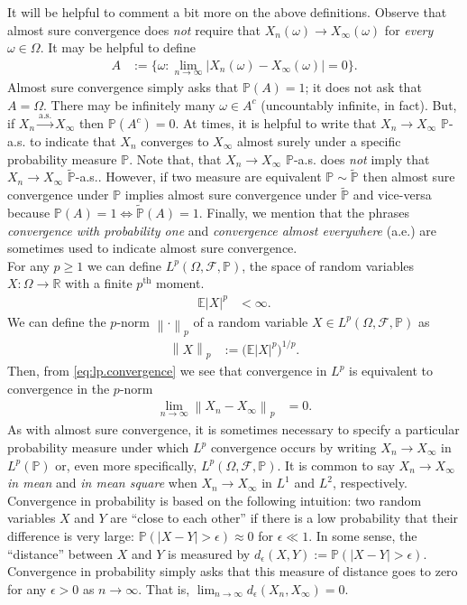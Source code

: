 \documentclass[12pt]{book}
\let\varepsilon\epsilon
\numberwithin{equation}{chapter}
\theoremstyle{plain}
\numberwithin{theorem}{section}
\theoremstyle{definition}
\numberwithin{exercise}{chapter}
\newcommand{\<}{\langle}
\renewcommand{\>}{\rangle}
\renewcommand{\(}{\left(}
\renewcommand{\)}{\right)}
\renewcommand{\[}{\left[}
\renewcommand{\]}{\right]}
\newcommand\Eb{\mathds{E}}
\newcommand\Pb{\mathds{P}}
\newcommand\Rb{\mathds{R}}
\newcommand\Fc{\mathscr{F}}
\newcommand\eps{\varepsilon}
\newcommand\om{\omega}
\newcommand\Om{\Omega}
\newcommand\Pbt{\widetilde{\Pb}}
\newcommand{\norm}[1]{\left\|#1\right\|}
\begin{document}
\noindent
It will be helpful to comment a bit more on the above definitions.
Observe that almost sure convergence does \emph{not} require that $X_n(\om) \to X_\infty(\om)$ for \emph{every} $\om \in \Om$.  It may be helpful to define
\begin{align}
A
	&:=	\{ \om : \lim_{n \to \infty} | X_n(\om) - X_\infty(\om) | = 0 \} .
\end{align}
Almost sure convergence simply asks that $\Pb( A ) = 1$; it does not ask that $A = \Om$.  There may be infinitely many $\om \in A^c$ (uncountably infinite, in fact).  But, if $X_n \stackrel{\text{a.s.}}{\to} X_\infty$ then $\Pb(A^c) = 0$.  At times, it is helpful to write that $X_n \to X_\infty$ $\Pb$-a.s. to indicate that $X_n$ converges to $X_\infty$ almost surely under a specific probability measure $\Pb$.  Note that, that $X_n \to X_\infty$ $\Pb$-a.s. does \emph{not} imply that $X_n \to X_\infty$ $\Pbt$-a.s..  However, if two measure are equivalent $\Pb \sim \Pbt$ then almost sure convergence under $\Pb$ implies almost sure convergence under $\Pbt$ and vice-versa because $\Pb(A) = 1 \Leftrightarrow \Pbt(A)=1$.  Finally, we mention that the phrases \emph{convergence with probability one} and \emph{convergence almost everywhere} (a.e.) are sometimes used to indicate almost sure convergence.
\\[0.5em]
For any $p \geq 1$ we can define $L^p(\Om,\Fc,\Pb)$, the space of random variables $X : \Om \to \Rb$ with a finite $p^\text{th}$ moment.
\begin{align}
\Eb |X|^p
	&< \infty .
\end{align}
We can define the $p$-norm $\norm{ \cdot }_p$ of a random variable $X \in L^p(\Om,\Fc,\Pb)$ as
\begin{align}
\norm{X}_p
	&:=	\big( \Eb |X|^p \big)^{1/p} .
\end{align}
Then, from \eqref{eq:lp.convergence} we see that convergence in $L^p$ is equivalent to convergence in the $p$-norm
\begin{align}
\lim_{n \to \infty} \norm{X_n - X_\infty}_p
	&=	0 .
\end{align}
As with almost sure convergence, it is sometimes necessary to specify a particular probability measure under which $L^p$ convergence occurs by writing $X_n \to X_\infty$ in $L^p(\Pb)$ or, even more specifically, $L^p(\Om,\Fc,\Pb)$.  It is common to say $X_n \to X_\infty$ \emph{in mean} and \emph{in mean square} when $X_n \to X_\infty$ in $L^1$ and $L^2$, respectively.
\\[0.5em]
Convergence in probability is based on the following intuition: two random variables $X$ and $Y$ are ``close to each other'' if there is a low probability that their difference is very large: $\Pb( | X - Y | > \eps ) \approx 0$ for $\eps \ll 1$.  In some sense, the ``distance'' between $X$ and $Y$ is measured by $d_\eps(X,Y) := \Pb( |X-Y| > \eps)$.  Convergence in probability simply asks that this measure of distance goes to zero for any $\eps > 0$ as $n \to \infty$.  That is, $\lim_{n \to \infty} d_\eps(X_n,X_\infty) = 0$.
\end{document}
